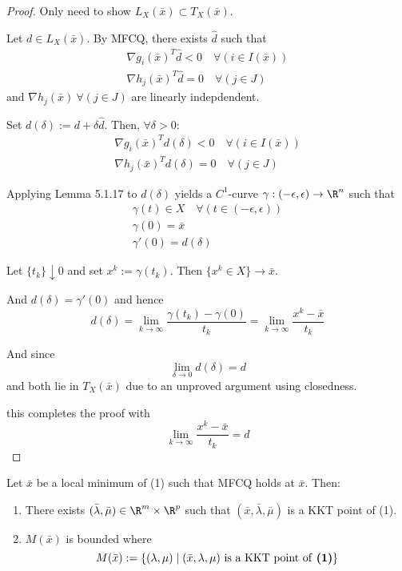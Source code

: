 \begin{proof}
	Only need to show $L_X(\bar x)\subset T_X(\bar x)$.

	Let $d\in L_X(\bar x)$. By MFCQ, there exists $\hat d$ such that
	\begin{gather*}
		\nabla g_i(\bar x)^T\hat d<0\quad\forall(i\in I(\bar x)) \\
		\nabla h_j(\bar x)^T\hat d=0\quad\forall(j\in J)
	\end{gather*}
	and $\nabla h_j(\bar x)\ \forall(j\in J)$ are linearly indepdendent.

	Set $d(\delta):= d + \delta\hat d$. Then, $\forall\delta>0$:
	\begin{gather*}
		\nabla g_i(\bar x)^T{d(\delta)}<0\quad\forall(i\in I(\bar x)) \\
		\nabla h_j(\bar x)^T{d(\delta)}=0\quad\forall(j\in J)
	\end{gather*}

	Applying Lemma 5.1.17 to $d(\delta)$ yields a $C^1$-curve
	$\gamma:(-\epsilon,\epsilon)\to\R^n$ such that
	\begin{gather*}
		\gamma(t) \in X\quad\forall(t\in(-\epsilon,\epsilon)) \\
		\gamma(0) = \bar x \\
		\gamma'(0)=d(\delta)
	\end{gather*}

	Let $\{t_k\}\downarrow0$ and set $x^k:=\gamma(t_k)$. Then
	$\{x^k\in X\}\to\bar x$.

	And $d(\delta)=\gamma'(0)$ and hence
	$$
		d(\delta)=\lim_{k\to\infty}\frac{\gamma(t_k)-\gamma(0)}{t_k}=
		\lim_{k\to\infty}\frac{x^k-\bar x}{t_k}
	$$

	And since
	$$
		\lim_{\delta\to0} d(\delta) = d
	$$
	and both lie in $T_X(\bar x)$ due to an unproved argument using
	closedness.

	this completes the proof with
	$$
		\lim_{k\to\infty}\frac{x^k-\bar x}{t_k}=d
	$$
\end{proof}

\label{b39f0fe}

Let $\bar x$ be a local minimum of (1) such that MFCQ holds at $\bar x$. Then:

\begin{enumerate}\renewcommand{\theenumi}{\alph{enumi}}
	\item There exists $(\bar\lambda, \bar\mu)\in\R^m\times\R^p$  such
	      that $(\bar x,\bar\lambda, \bar\mu)$ is a KKT point of (1).
	\item $M(\bar x)$ is bounded where
	      $$
		      M(\bar x):=\{(\lambda,\mu)\mid(\bar x,\lambda,\mu)\text{ is a KKT point of \textbf{(1)}} \}
	      $$
\end{enumerate}

